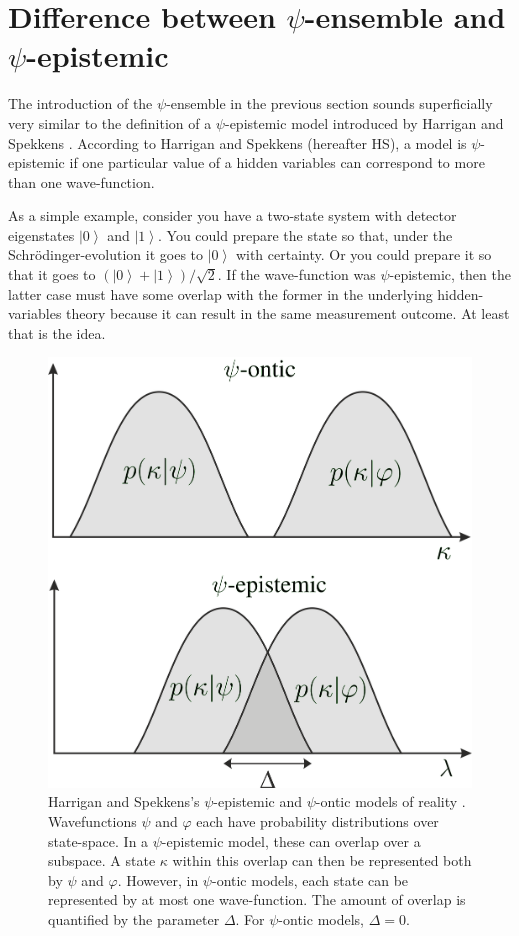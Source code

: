 \documentclass[superscriptaddress,twocolumn,floatfix,nofootinbib]{revtex4-2}
\newcommand{\ket}[1]{\left| #1 \right\rangle}
\begin{document}
\section{Difference between \texorpdfstring{$\psi$}{psi}-ensemble and \texorpdfstring{$\psi$}{psi}-epistemic}
\label{onticepistemic}


The introduction of the $\psi$-ensemble in the previous section sounds superficially very similar to the definition of a $\psi$-epistemic model introduced by Harrigan and Spekkens \cite{Harrigan2010OMF}. According to Harrigan and Spekkens (hereafter HS), a model is $\psi$-epistemic if one particular value of a hidden variables can correspond to more than one wave-function. 

As a simple example, consider you have a two-state system with detector eigenstates $\ket{0}$ and $\ket{1}$. You could prepare the state so that, under the Schr\"odinger-evolution it goes to $\ket{0}$ with certainty. Or you could prepare it so that it goes to $(\ket{0} + \ket{1})/\sqrt{2}$. If the wave-function was $\psi$-epistemic, then the latter case must have some overlap with the former in the underlying hidden-variables theory because it can result in the same measurement outcome. At least that is the idea.

\begin{figure}
    \centering
    \includegraphics[width=\linewidth]{episont.png}
    \caption{Harrigan and Spekkens's $\psi$-epistemic and $\psi$-ontic models of reality \cite{Harrigan2010OMF}. Wavefunctions $\psi$ and $\varphi$ each have probability distributions over state-space. In a $\psi$-epistemic model, these can overlap over a subspace. A state $\kappa$ within this overlap can then be represented both by $\psi$ and $\varphi$. However, in $\psi$-ontic models, each state can be represented by at most one wave-function. The amount of overlap is quantified by the parameter $\Delta$. For $\psi$-ontic models, $\Delta =0$.}
    \label{fig:Graphs}
\end{figure}
\end{document}
